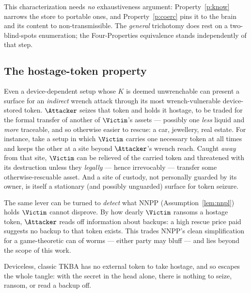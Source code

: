 \noindent This characterization needs \emph{no} exhaustiveness argument:
Property~\ref{p:know} narrows the store to portable ones, and
Property~\ref{p:coerc} pins it to the brain and its content to non-transmissible.
The \emph{general} trichotomy does rest on a two-blind-spots enumeration; the
Four-Properties equivalence stands independently of that step.

\subsection{The hostage-token property}
\label{app:chain-hostage}

\begin{remark}\label{rem:hostage}
Even a device-dependent setup whose $K$ is deemed unwrenchable can present a surface
for an \emph{indirect} wrench attack through its most wrench-vulnerable device-stored
token. $\Attacker$ seizes that token and holds it hostage, to be traded for the
formal transfer of another of $\Victim$'s assets --- possibly one \emph{less} liquid
and \emph{more} traceable, and so otherwise easier to rescue: a car, jewellery, real
estate. For instance, take a setup in which $\Victim$ carries one necessary token at
all times and keeps the other at a site beyond $\Attacker$'s wrench reach. Caught
\emph{away} from that site, $\Victim$ can be relieved of the carried token and
threatened with its destruction unless they \emph{legally} --- hence irrevocably ---
transfer some otherwise-rescuable asset. And a site of custody, not personally
guarded by its owner, is itself a stationary (and possibly unguarded) surface for
token seizure.
\end{remark}

\begin{remark}\label{rem:hostage-probe}
The same lever can be turned to \emph{detect} what NNPP (Assumption~\ref{lem:nnpl})
holds $\Victim$ cannot disprove. By how dearly $\Victim$ ransoms a hostage token,
$\Attacker$ reads off information about backups: a high rescue price paid suggests no
backup to that token exists. This trades NNPP's clean simplification for a
game-theoretic can of worms --- either party may bluff --- and lies beyond the scope
of this work.
\end{remark}

\begin{remark}\label{rem:hostage-tkba}
Deviceless, classic TKBA has no external token to take hostage, and so escapes the
whole tangle: with the secret in the head alone, there is nothing to seize, ransom,
or read a backup off.
\end{remark}

